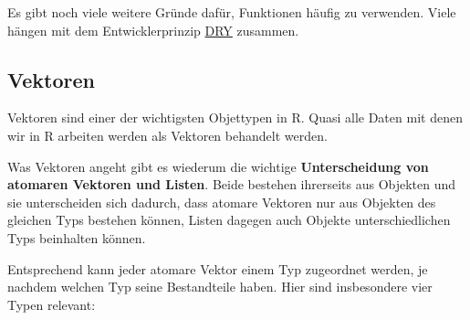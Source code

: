 \documentclass[]{book}
\begin{document}
Es gibt noch viele weitere Gründe dafür, Funktionen häufig zu verwenden.
Viele hängen mit dem Entwicklerprinzip
\href{https://de.wikipedia.org/wiki/Don\%E2\%80\%99t_repeat_yourself}{DRY}
zusammen.

\subsection{Vektoren}\label{vektoren}

Vektoren sind einer der wichtigsten Objettypen in R. Quasi alle Daten
mit denen wir in R arbeiten werden als Vektoren behandelt werden.

Was Vektoren angeht gibt es wiederum die wichtige \textbf{Unterscheidung
von atomaren Vektoren und Listen}. Beide bestehen ihrerseits aus
Objekten und sie unterscheiden sich dadurch, dass atomare Vektoren nur
aus Objekten des gleichen Typs bestehen können, Listen dagegen auch
Objekte unterschiedlichen Typs beinhalten können.

Entsprechend kann jeder atomare Vektor einem Typ zugeordnet werden, je
nachdem welchen Typ seine Bestandteile haben. Hier sind insbesondere
vier Typen relevant:
\end{document}
